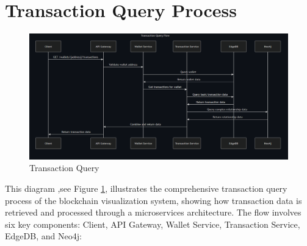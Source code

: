 \section{Transaction Query Process}
\begin{figure}[h]
    \centering
    \includegraphics[width=\textwidth, keepaspectratio]{figures/_query.png}
    \caption{Transaction Query}
    \label{fig:Transaction Query}
\end{figure}
This diagram ,see Figure \ref{fig:Transaction Query}, illustrates the comprehensive transaction query process of the blockchain visualization system, showing how transaction data is retrieved and processed through a microservices architecture. The flow involves six key components: Client, API Gateway, Wallet Service, Transaction Service, EdgeDB, and Neo4j:

